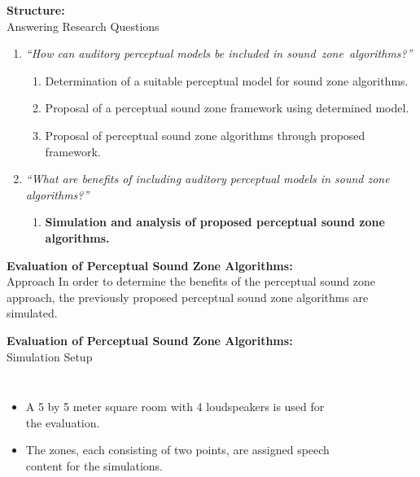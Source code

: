 \documentclass[aspectratio=169]{beamer}
\begin{document}
\begin{frame}{\textbf{Structure:}\\ Answering Research Questions}
    \begin{enumerate}
        \item {\textit{``How can auditory perceptual models be included in sound~zone~algorithms?''}}
            \vspace{7pt}
            \begin{enumerate}
                \item Determination of a suitable perceptual model for sound zone algorithms.
                \vspace{7pt}
                \item Proposal of a perceptual sound zone framework using determined model. 
                \vspace{7pt}
                \item Proposal of perceptual sound zone algorithms through proposed framework.
                \vspace{7pt}
            \end{enumerate}
        \item {\textit{``What are benefits of including auditory perceptual models in sound zone algorithms?''}}
            \vspace{-5pt}
            \begin{enumerate}
                \item \textbf{Simulation and analysis of proposed perceptual sound zone algorithms.}
            \end{enumerate}
    \end{enumerate}
\end{frame}

\begin{frame}{\textbf{Evaluation of Perceptual Sound Zone Algorithms:}\\ Approach}
    In order to determine the benefits of the perceptual sound zone approach, the previously 
    proposed perceptual sound zone algorithms are simulated.
\end{frame}

\begin{frame}{\textbf{Evaluation of Perceptual Sound Zone Algorithms:}\\ Simulation Setup}
    \begin{columns}[c]
        \begin{itemize}
            \item A 5 by 5 meter square room with 4 loudspeakers is used for the evaluation.
            \item The zones, each consisting of two points, are assigned speech content for the simulations.
        \end{itemize}
        \begin{figure}[]
            \centering
            \scalebox{0.7}{}
        \end{figure}
    \end{columns}
\end{frame}
\end{document}
